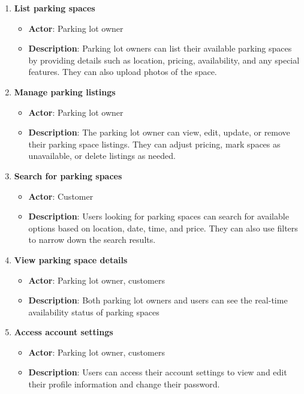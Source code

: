\begin{enumerate}
    \item \textbf{List parking spaces}
    \begin{itemize}
        \item \textbf{Actor}: Parking lot owner
        \item \textbf{Description}: Parking lot owners can list their available parking spaces by providing details such as location, pricing, availability, and any special features. They can also upload photos of the space.
    \end{itemize}
    \item \textbf{Manage parking listings}
    \begin{itemize}
        \item \textbf{Actor}: Parking lot owner
        \item \textbf{Description}: The parking lot owner can view, edit, update, or remove their parking space listings. They can adjust pricing, mark spaces as unavailable, or delete listings as needed.
    \end{itemize}
    \item \textbf{Search for parking spaces}
    \begin{itemize}
        \item \textbf{Actor}: Customer
        \item \textbf{Description}: Users looking for parking spaces can search for available options based on location, date, time, and price. They can also use filters to narrow down the search results.
    \end{itemize}
    \item \textbf{View parking space details}
    \begin{itemize}
        \item \textbf{Actor}: Parking lot owner, customers
        \item \textbf{Description}: Both parking lot owners and users can see the real-time availability status of parking spaces
    \end{itemize}
    \item \textbf{Access account settings}
    \begin{itemize}
        \item \textbf{Actor}: Parking lot owner, customers
        \item \textbf{Description}: Users can access their account settings to view and edit their profile information and change their password.
    \end{itemize}
\end{enumerate}

